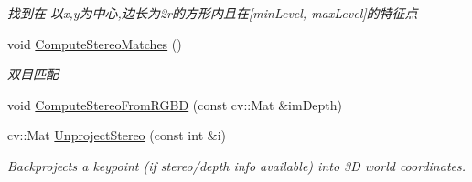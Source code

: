 \begin{DoxyCompactItemize}
\begin{DoxyCompactList}\small\item\em 找到在 以x,y为中心,边长为2r的方形内且在\mbox{[}min\+Level, max\+Level\mbox{]}的特征点 \end{DoxyCompactList}\item 
void \mbox{\hyperlink{class_o_r_b___s_l_a_m2_1_1_frame_a77a570d7851bad90ca31c4d55a5105e7}{Compute\+Stereo\+Matches}} ()
\begin{DoxyCompactList}\small\item\em 双目匹配 \end{DoxyCompactList}\item 
void \mbox{\hyperlink{class_o_r_b___s_l_a_m2_1_1_frame_a2818781adf6aec30b8bd8783ba228dce}{Compute\+Stereo\+From\+R\+G\+BD}} (const cv\+::\+Mat \&im\+Depth)
\item 
cv\+::\+Mat \mbox{\hyperlink{class_o_r_b___s_l_a_m2_1_1_frame_a46084d187e1fc60181e1c72f77c733ca}{Unproject\+Stereo}} (const int \&i)
\begin{DoxyCompactList}\small\item\em Backprojects a keypoint (if stereo/depth info available) into 3D world coordinates. \end{DoxyCompactList}\end{DoxyCompactItemize}
